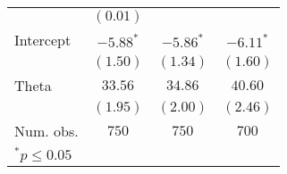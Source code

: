 \begin{table}
\begin{center}
\begin{tabular}{l c c c}
                            & $(0.01)$    &                & \\
Intercept                   & $-5.88^{*}$ & $-5.86^{*}$        &$-6.11^{*}$\\
                            & $(1.50)$      & $(1.34)$       &$(1.60)$\\
Theta                       & $33.56$     & $34.86$        &$40.60$\\
                            & $(1.95)$      & $(2.00)$       &$(2.46)$\\
\hline
Num. obs.                   & $750$         & $750$          &$700$\\
\hline
\multicolumn{3}{l}{\scriptsize{$^*p\leq0.05$}}
\end{tabular}
\end{center}
\end{table}
